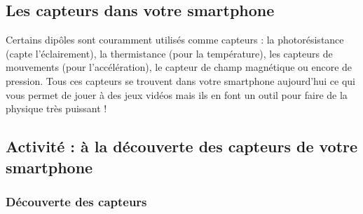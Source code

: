 \documentclass[french, a4paper, 12pt]{article}
\begin{document}

\subsection{Les capteurs dans votre smartphone} 

Certains dipôles sont couramment utilisés comme capteurs : la photorésistance (capte l'éclairement), la thermistance (pour la température), les capteurs de mouvements (pour l'accélération), le capteur de champ magnétique ou encore de pression. Tous ces capteurs se trouvent dans votre smartphone aujourd'hui ce qui vous permet de jouer à des jeux vidéos mais ils en font un outil pour faire de la physique très puissant ! 

\subsection{Activité : à la découverte des capteurs de votre smartphone}

\subsubsection{Découverte des capteurs }
\end{document}
